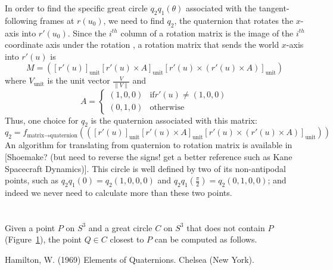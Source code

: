 In order to find the specific great circle $q_2 q_1(\theta)$ associated
with the tangent-following frames at $r(u_0)$,
we need to find $q_2$, the quaternion that rotates the $x$-axis into $r'(u_0)$.
Since the $i^{th}$ column of a rotation matrix is the image of the $i^{th}$
coordinate axis under the rotation \cite{foleyVanDam},
a rotation matrix that sends the world $x$-axis into $r'(u)$ is
%
\begin{equation}
M = ([r'(u)]_{\mbox{unit}} [r'(u) \times A]_{\mbox{unit}} 
	[r'(u) \times (r'(u) \times A)]_{\mbox{unit}} )
\end{equation}
%
where $V_{\mbox{unit}}$ is the unit vector $\frac{V}{\|V\|}$
and
\[
	A = \left\{ \begin{array}{ll}
		(1,0,0)	& \mbox{if} r'(u) \neq (1,0,0) \\
		(0,1,0) & \mbox{otherwise}
		\end{array} \right.
\]
Thus, one choice for $q_2$ is the quaternion associated with this matrix:
%
\begin{equation}
	q_2 = f_{\mbox{matrix} \rightarrow \mbox{quaternion}} 
	(([r'(u)]_{\mbox{unit}} [r'(u) \times A]_{\mbox{unit}} 
	 [r'(u) \times (r'(u) \times A)]_{\mbox{unit}} ))
\end{equation}
%
An algorithm for translating from quaternion to rotation matrix is available
in [Shoemake? \cite{} (but need to reverse the signs! get a better reference
such as Kane Spacecraft Dynamics)].
This circle is well defined by two of its non-antipodal points,
such as $q_2 q_1(0) = q_2 (1,0,0,0)$ and $q_2 q_1(\frac{\pi}{2})
= q_2 (0,1,0,0)$;
and indeed we never need to calculate more than these two points.

\section{}

Given a point $P$ on $S^3$ and a great circle $C$ on $S^3$ that does not contain
$P$ (Figure~\ref{}), the point $Q \in C$ closest to $P$ can be computed
as follows.


\begin{thebibliography}{99}

Hamilton, W. (1969)
Elements of Quaternions.
Chelsea (New York).

\end{thebibliography}



